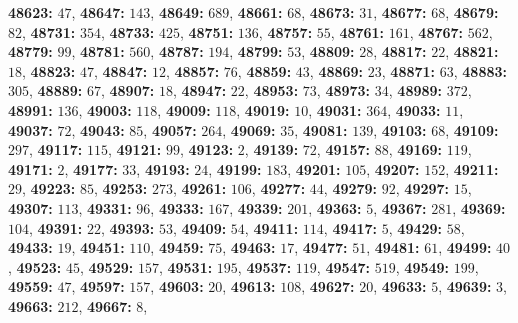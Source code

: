 \textsf{\bfseries 48623:} $47$, \textsf{\bfseries 48647:} $143$, \textsf{\bfseries 48649:} $689$, \textsf{\bfseries 48661:} $68$, \textsf{\bfseries 48673:} $31$, \textsf{\bfseries 48677:} $68$, \textsf{\bfseries 48679:} $82$, \textsf{\bfseries 48731:} $354$, \textsf{\bfseries 48733:} $425$, \textsf{\bfseries 48751:} $136$, \textsf{\bfseries 48757:} $55$, \textsf{\bfseries 48761:} $161$, \textsf{\bfseries 48767:} $562$, \textsf{\bfseries 48779:} $99$, \textsf{\bfseries 48781:} $560$, \textsf{\bfseries 48787:} $194$, \textsf{\bfseries 48799:} $53$, \textsf{\bfseries 48809:} $28$, \textsf{\bfseries 48817:} $22$, \textsf{\bfseries 48821:} $18$, \textsf{\bfseries 48823:} $47$, \textsf{\bfseries 48847:} $12$, \textsf{\bfseries 48857:} $76$, \textsf{\bfseries 48859:} $43$, \textsf{\bfseries 48869:} $23$, \textsf{\bfseries 48871:} $63$, \textsf{\bfseries 48883:} $305$, \textsf{\bfseries 48889:} $67$, \textsf{\bfseries 48907:} $18$, \textsf{\bfseries 48947:} $22$, \textsf{\bfseries 48953:} $73$, \textsf{\bfseries 48973:} $34$, \textsf{\bfseries 48989:} $372$, \textsf{\bfseries 48991:} $136$, \textsf{\bfseries 49003:} $118$, \textsf{\bfseries 49009:} $118$, \textsf{\bfseries 49019:} $10$, \textsf{\bfseries 49031:} $364$, \textsf{\bfseries 49033:} $11$, \textsf{\bfseries 49037:} $72$, \textsf{\bfseries 49043:} $85$, \textsf{\bfseries 49057:} $264$, \textsf{\bfseries 49069:} $35$, \textsf{\bfseries 49081:} $139$, \textsf{\bfseries 49103:} $68$, \textsf{\bfseries 49109:} $297$, \textsf{\bfseries 49117:} $115$, \textsf{\bfseries 49121:} $99$, \textsf{\bfseries 49123:} $2$, \textsf{\bfseries 49139:} $72$, \textsf{\bfseries 49157:} $88$, \textsf{\bfseries 49169:} $119$, \textsf{\bfseries 49171:} $2$, \textsf{\bfseries 49177:} $33$, \textsf{\bfseries 49193:} $24$, \textsf{\bfseries 49199:} $183$, \textsf{\bfseries 49201:} $105$, \textsf{\bfseries 49207:} $152$, \textsf{\bfseries 49211:} $29$, \textsf{\bfseries 49223:} $85$, \textsf{\bfseries 49253:} $273$, \textsf{\bfseries 49261:} $106$, \textsf{\bfseries 49277:} $44$, \textsf{\bfseries 49279:} $92$, \textsf{\bfseries 49297:} $15$, \textsf{\bfseries 49307:} $113$, \textsf{\bfseries 49331:} $96$, \textsf{\bfseries 49333:} $167$, \textsf{\bfseries 49339:} $201$, \textsf{\bfseries 49363:} $5$, \textsf{\bfseries 49367:} $281$, \textsf{\bfseries 49369:} $104$, \textsf{\bfseries 49391:} $22$, \textsf{\bfseries 49393:} $53$, \textsf{\bfseries 49409:} $54$, \textsf{\bfseries 49411:} $114$, \textsf{\bfseries 49417:} $5$, \textsf{\bfseries 49429:} $58$, \textsf{\bfseries 49433:} $19$, \textsf{\bfseries 49451:} $110$, \textsf{\bfseries 49459:} $75$, \textsf{\bfseries 49463:} $17$, \textsf{\bfseries 49477:} $51$, \textsf{\bfseries 49481:} $61$, \textsf{\bfseries 49499:} $40$, \textsf{\bfseries 49523:} $45$, \textsf{\bfseries 49529:} $157$, \textsf{\bfseries 49531:} $195$, \textsf{\bfseries 49537:} $119$, \textsf{\bfseries 49547:} $519$, \textsf{\bfseries 49549:} $199$, \textsf{\bfseries 49559:} $47$, \textsf{\bfseries 49597:} $157$, \textsf{\bfseries 49603:} $20$, \textsf{\bfseries 49613:} $108$, \textsf{\bfseries 49627:} $20$, \textsf{\bfseries 49633:} $5$, \textsf{\bfseries 49639:} $3$, \textsf{\bfseries 49663:} $212$, \textsf{\bfseries 49667:} $8$, 
